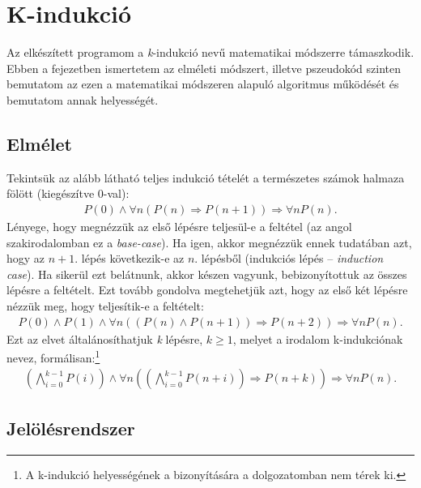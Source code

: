 \chapter{K-indukció}

Az elkészített programom a \emph{k}-indukció nevű matematikai módszerre \cite{k_induction_principle} támaszkodik. Ebben a fejezetben ismertetem az elméleti módszert, illetve pszeudokód szinten bemutatom az ezen a matematikai módszeren alapuló algoritmus működését és bemutatom annak helyességét.

\section{Elmélet}

Tekintsük az alább látható teljes indukció tételét a természetes számok halmaza fölött (kiegészítve 0-val): 
\begin{align}
	P(0) \wedge \forall n (P(n) \Rightarrow P(n+1)) \Rightarrow \forall nP(n).
\end{align}
Lényege, hogy megnézzük az első lépésre teljesül-e a feltétel (az angol szakirodalomban ez a \emph{base-case}). Ha igen, akkor megnézzük ennek tudatában azt, hogy az $n+1$. lépés következik-e az $n$. lépésből (indukciós lépés -- \emph{induction case}). Ha sikerül ezt belátnunk, akkor készen vagyunk, bebizonyítottuk az összes lépésre a feltételt.
\newline
\newline
Ezt tovább gondolva megtehetjük azt, hogy az első két lépésre nézzük meg, hogy teljesítik-e a feltételt:
\begin{align}
	P(0) \wedge P(1) \wedge \forall n ((P(n) \wedge P(n+1)) \Rightarrow P(n+2) ) \Rightarrow \forall n P(n).
\end{align}
Ezt az elvet általánosíthatjuk \emph{k} lépésre, $k \geq 1$, melyet a irodalom \cite{k_induction_principle} k-indukciónak nevez, formálisan:\footnote{A k-indukció helyességének a bizonyítására a dolgozatomban nem térek ki.}
\begin{align}
	\left( \bigwedge_{i=0}^{k-1} P(i) \right) \wedge \forall n \left( \left( \bigwedge_{i=0}^{k-1} P(n+i) \right) \Rightarrow P(n+k) \right) \Rightarrow \forall n P(n).
\end{align}

\section{Jelölésrendszer}

